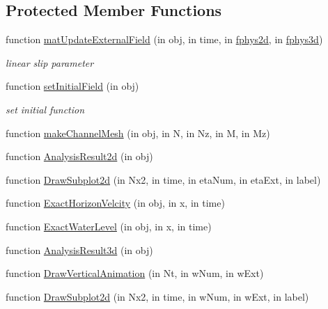 \subsection*{Protected Member Functions}
\begin{DoxyCompactItemize}
\item 
function \hyperlink{class_close_channel3d_a9573c0172a57faa52d8050fa01e7e522}{mat\+Update\+External\+Field} (in obj, in time, in \hyperlink{class_l_s_w_e_abstract3d_ac109e689a672a973a96c1068a45cf15c}{fphys2d}, in \hyperlink{class_l_s_w_e_abstract3d_a85a25b72732b21d0d624e9f88ed52dc4}{fphys3d})
\begin{DoxyCompactList}\small\item\em linear slip parameter \end{DoxyCompactList}\item 
function \hyperlink{class_close_channel3d_a4ae91273dbd47d396d34f0a42c42b7ab}{set\+Initial\+Field} (in obj)
\begin{DoxyCompactList}\small\item\em set initial function \end{DoxyCompactList}\item 
function \hyperlink{class_close_channel3d_a44692f7398631fd736976730915bb7a5}{make\+Channel\+Mesh} (in obj, in N, in Nz, in M, in Mz)
\item 
function \hyperlink{class_close_channel3d_a00efddf75bdc59cfcb7ca530817fd68a}{Analysis\+Result2d} (in obj)
\item 
function \hyperlink{class_close_channel3d_a6087f17d4cdfe3482814cb5ec3008fd4}{Draw\+Subplot2d} (in Nx2, in time, in eta\+Num, in eta\+Ext, in label)
\item 
function \hyperlink{class_close_channel3d_a7ac408d7b480a184e7ba63f62b6af1ab}{Exact\+Horizon\+Velcity} (in obj, in x, in time)
\item 
function \hyperlink{class_close_channel3d_ac4101dadf9cbe3c488fdc59b494753a7}{Exact\+Water\+Level} (in obj, in x, in time)
\item 
function \hyperlink{class_close_channel3d_aeb601422cf73955b968eec95c21cda5b}{Analysis\+Result3d} (in obj)
\item 
function \hyperlink{class_close_channel3d_a53457279170f22dc862fa55e852e44ce}{Draw\+Vertical\+Animation} (in Nt, in w\+Num, in w\+Ext)
\item 
function \hyperlink{class_close_channel3d_ab8a07111c3a3389aab59b92a9396d7ee}{Draw\+Subplot2d} (in Nx2, in time, in w\+Num, in w\+Ext, in label)
\item 

\end{DoxyCompactItemize}
